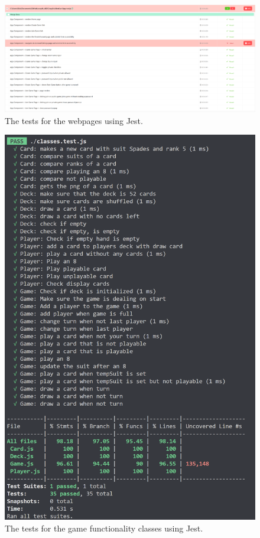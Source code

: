 \documentclass{article}
\begin{document}
\begin{figure}[h]
\centering
\includegraphics[width=\linewidth]{tests2_2.png}
\caption{\label{fig:testss2_2}The tests for the webpages using Jest.}
\end{figure}

\begin{figure}[h]
\centering
\includegraphics[width=\linewidth]{testss2_3.png}
\caption{\label{fig:testss2_3}The tests for the game functionality classes using Jest.}
\end{figure}
\end{document}
